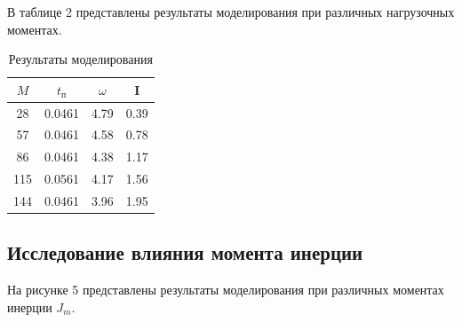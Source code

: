 \documentclass[a4paper, 11pt]{article}
\begin{document}
\par 
В таблице 2 представлены результаты моделирования при различных нагрузочных моментах.
\newpage
\begin{table}[h!]
\centering
	\begin{threeparttable}
	\caption{Результаты моделирования}\label{tab:perflogcross}
		\begin{tabular}{|c|c|c|c|}
			\hline
			$M$ & $t_\text{п}$ & $\omega$ & I\\
			\hline
			28 & 0.0461 & 4.79 & 0.39\\
			\hline
			57 & 0.0461 & 4.58 & 0.78\\
			\hline
			86 & 0.0461 & 4.38 & 1.17\\
			\hline
			115 & 0.0561 & 4.17 & 1.56\\
			\hline
			144 & 0.0461 & 3.96 & 1.95\\
			\hline
		\end{tabular}
	\end{threeparttable}
\end{table}

\newpage
\begin{center}
	\section{Исследование влияния момента инерции}
\end{center}
\par 
На рисунке 5 представлены результаты моделирования при различных моментах инерции $J_m$.
\end{document}

